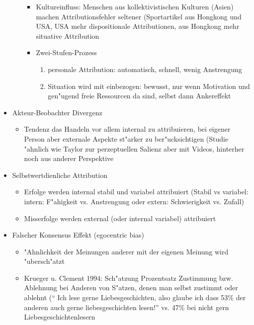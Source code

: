 \begin{itemize}
\begin{itemize}
\begin{itemize}
					\item
						Kultureinfluss: Menschen aus kollektivistischen Kulturen (Asien) machen Attributionsfehler seltener (Sportartikel aus Hongkong und USA, USA mehr dispositionale Attributionen, aus Hongkong mehr situative Attribution
					\item
						Zwei-Stufen-Prozess
						\begin{enumerate}
							\item
								personale Attribution: automatisch, schnell, wenig Anstrengung
							\item
								Situation wird mit einbezogen: bewusst, nur wenn Motivation und gen"ugend freie Ressourcen da sind, selbst dann Ankereffekt
					\end{enumerate}
				\end{itemize}

		\end{itemize}

	\item
		Akteur-Beobachter Divergenz
		\begin{itemize}
			\item
				Tendenz das Handeln vor allem internal zu attribuieren, bei eigener Person aber externale Aspekte st"arker zu ber"ucksichtigen (Studie "ahnlich wie Taylor zur perzeptuellen Salienz aber mit Videos, hinterher noch aus anderer Perspektive
		\end{itemize}
	\item
		Selbstwertdienliche Attribution
		\begin{itemize}
			\item
				Erfolge werden internal stabil und variabel attribuiert (Stabil vs variabel: intern: F"ahigkeit vs. Anstrengung oder extern: Schwierigkeit vs. Zufall)
			\item
				Misserfolge werden external (oder internal variabel) attribuiert
		\end{itemize}
	\item
		Falscher Konsensus Effekt (egocentric bias)
		\begin{itemize}
			\item
				"Ahnlichkeit der Meinungen anderer mit der eigenen Meinung wird "ubersch"atzt
			\item
				Krueger u. Clement 1994: Sch"atzung Prozentsatz Zustimmung bzw. Ablehnung bei Anderen von S"atzen, denen man selbst zustimmt oder ablehnt (\enquote{ Ich lese gerne Liebesgeschichten, also glaube ich dass 53\% der anderen auch gerne liebesgeschichten lesen!} vs. 47\% bei nicht gern Liebesgeschichtenlesern
		\end{itemize}
\end{itemize}

